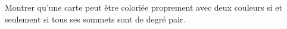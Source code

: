 Montrer qu'une carte peut être coloriée proprement avec deux couleurs si et seulement si tous ses sommets sont de degré pair.
